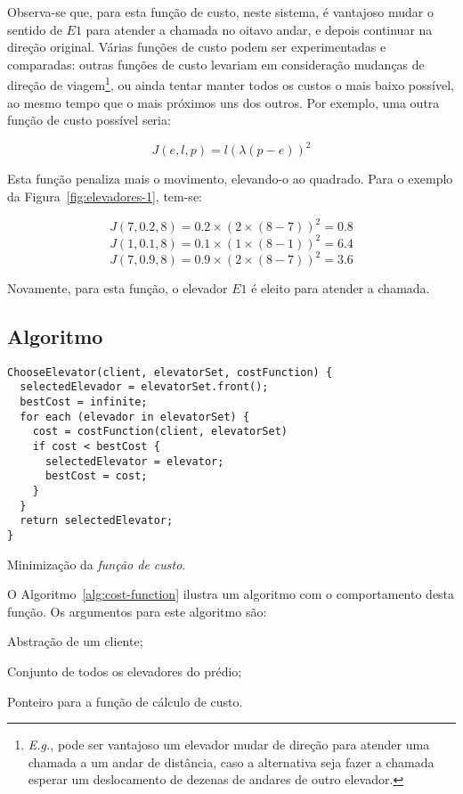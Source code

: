 Observa-se que, para esta função de custo, neste sistema, é vantajoso mudar o
sentido de $E1$ para atender a chamada no oitavo andar, e depois continuar na
direção original. Várias funções de custo podem ser experimentadas e comparadas:
outras funções de custo levariam em consideração mudanças de direção de
viagem\footnote{\textit{E.g.}, pode ser vantajoso um elevador mudar de direção
para atender uma chamada a um andar de distância, caso a alternativa seja fazer a
chamada esperar um deslocamento de dezenas de andares de outro elevador.}, ou
ainda tentar manter todos os custos o mais baixo possível, ao mesmo tempo que o
mais próximos uns dos outros. Por exemplo, uma outra função de custo possível
seria:

\[J(e, l, p) = l(\lambda(p - e))^{2}\]

Esta função penaliza mais o movimento, elevando-o ao quadrado. Para o exemplo da
Figura~\ref{fig:elevadores-1}, tem-se:

\[J(7, 0.2, 8) = 0.2 \times (2 \times (8-7))^2 = 0.8\]
\[J(1, 0.1, 8) = 0.1 \times (1 \times (8-1))^2 = 6.4\]
\[J(7, 0.9, 8) = 0.9 \times (2 \times (8-7))^2 = 3.6\]

Novamente, para esta função, o elevador $E1$ é eleito para atender a chamada.

\subsection{Algoritmo}

\begin{algorithm}[htb!]
  \centering
    \begin{verbatim}
ChooseElevator(client, elevatorSet, costFunction) {
  selectedElevador = elevatorSet.front();
  bestCost = infinite;
  for each (elevador in elevatorSet) {
    cost = costFunction(client, elevatorSet)
    if cost < bestCost {
      selectedElevator = elevator;
      bestCost = cost;
    }
  }
  return selectedElevator;
}
    \end{verbatim}
  \caption{\label{alg:cost-function}Minimização da \textit{função de custo}.}
\end{algorithm}


O Algoritmo~\ref{alg:cost-function} ilustra um algoritmo com o comportamento desta
função. Os argumentos para este algoritmo são:

\begin{description}[leftmargin=!,labelwidth=\widthof{\bfseries $costFunction$}]\setlength\itemsep{0mm}
  \item[$client$] Abstração de um cliente;
  \item[$elevatorset$] Conjunto de todos os elevadores do prédio;
  \item[$costFunction$] Ponteiro para a função de cálculo de custo.
\end{description}

